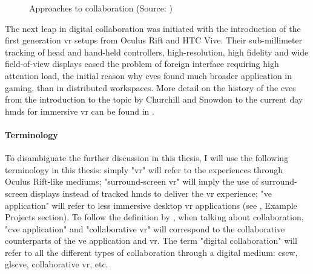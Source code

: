 \begin{figure}
	\centering
	\hfill
	\hfill
	\hfill
	\caption{Approaches to collaboration (Source: \cite{churchill_collaborative_1998})}
	\label{fig:approaches_to_collaboration}
\end{figure}

The next leap in digital collaboration was initiated with the introduction of the first generation \gls{vr} setups from Oculus Rift and HTC Vive. Their sub-millimeter tracking of head and hand-held controllers, high-resolution, high fidelity and wide field-of-view displays eased the problem of foreign interface  requiring high attention load, the initial reason why \gls{cve}s found much broader application in gaming, than in distributed workspaces. More detail on the history of the \gls{cve}s from the introduction to the topic by Churchill and Snowdon to the current day \gls{hmd}s for immersive \gls{vr} can be found in \cite{greenwald_technology_2017}.

\paragraph{Terminology}
To disambiguate the further discussion in this thesis, I will use the following terminology in this thesis: simply "\gls{vr}" will refer to the experiences through Oculus Rift-like mediums; "surround-screen \gls{vr}" will imply the use of surround-screen displays instead of tracked \gls{hmd}s to deliver the \gls{vr} experience; "\gls{ve} application" will refer to less immersive desktop \gls{vr} applications (see \cite{churchill_collaborative_1998}, Example Projects section). 
To follow the definition by \cite{jr_3d_2017}, when talking about collaboration, "\gls{cve} application" and "collaborative \gls{vr}" will correspond to the collaborative counterparts of the \gls{ve} application and \gls{vr}.
The term "digital collaboration" will refer to all the different types of collaboration through a digital medium: \gls{cscw}, gls{cve}, collaborative \gls{vr}, etc.

